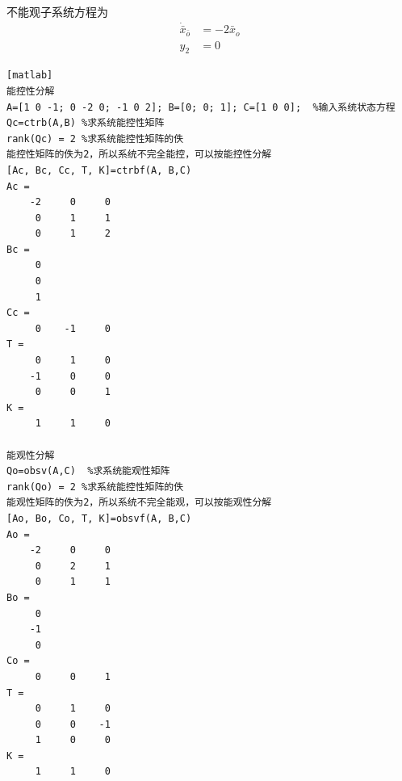 \documentclass[a4paper]{article}
\begin{document}
不能观子系统方程为\\
\begin{align*}
\dot{\bar{x}}_{\bar{o}} &= -2\bar{x}_o \\
y_2 &= 0
\end{align*}
\begin{verbatim}[matlab]
能控性分解
A=[1 0 -1; 0 -2 0; -1 0 2]; B=[0; 0; 1]; C=[1 0 0];  %输入系统状态方程
Qc=ctrb(A,B) %求系统能控性矩阵
rank(Qc) = 2 %求系统能控性矩阵的佚  
能控性矩阵的佚为2，所以系统不完全能控，可以按能控性分解
[Ac, Bc, Cc, T, K]=ctrbf(A, B,C)
Ac =
    -2     0     0
     0     1     1
     0     1     2
Bc =
     0
     0
     1
Cc =
     0    -1     0
T =
     0     1     0
    -1     0     0
     0     0     1
K =
     1     1     0

能观性分解
Qo=obsv(A,C)  %求系统能观性矩阵   
rank(Qo) = 2 %求系统能控性矩阵的佚
能观性矩阵的佚为2，所以系统不完全能观，可以按能观性分解
[Ao, Bo, Co, T, K]=obsvf(A, B,C)
Ao =
    -2     0     0
     0     2     1
     0     1     1
Bo =
     0
    -1
     0
Co =
     0     0     1
T =
     0     1     0
     0     0    -1
     1     0     0
K =
     1     1     0     
\end{verbatim}
\end{document}
